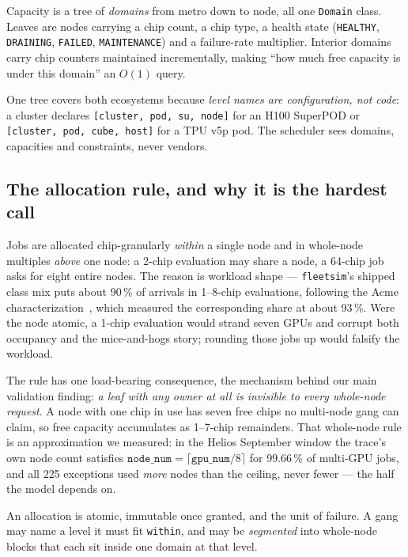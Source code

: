 Capacity is a tree of \emph{domains} from metro down to node, all one
\texttt{Domain} class. Leaves are nodes carrying a chip count, a chip type, a
health state (\texttt{HEALTHY}, \texttt{DRAINING}, \texttt{FAILED},
\texttt{MAINTENANCE}) and a failure-rate multiplier. Interior domains carry chip
counters maintained incrementally, making ``how much free capacity is under this
domain'' an $O(1)$ query.

One tree covers both ecosystems because \emph{level names are configuration, not
code}: a cluster declares \texttt{[cluster, pod, su, node]} for an H100 SuperPOD
or \texttt{[cluster, pod, cube, host]} for a TPU v5p pod. The scheduler sees
domains, capacities and constraints, never vendors.

\subsection{The allocation rule, and why it is the hardest call}

Jobs are allocated chip-granularly \emph{within} a single node and in whole-node
multiples \emph{above} one node: a 2-chip evaluation may share a node, a 64-chip
job asks for eight entire nodes. The reason is workload shape ---
\texttt{fleetsim}'s shipped class mix puts about 90\,\% of arrivals in 1--8-chip
evaluations, following the Acme characterization~\cite{acme2024}, which measured
the corresponding share at about 93\,\%. Were the node atomic,
a 1-chip evaluation would strand seven GPUs and corrupt both occupancy and the
mice-and-hogs story; rounding those jobs up would falsify the workload.

The rule has one load-bearing consequence, the mechanism behind our main
validation finding: \emph{a leaf with any owner at all is invisible to every
whole-node request}. A node with one chip in use has seven free chips no
multi-node gang can claim, so free capacity accumulates as 1--7-chip remainders.
That whole-node rule is an approximation we measured: in the Helios September
window the
trace's own node count satisfies $\texttt{node\_num} = \lceil
\texttt{gpu\_num}/8 \rceil$ for 99.66\,\% of multi-GPU jobs, and all 225
exceptions used \emph{more} nodes than the ceiling, never fewer --- the half the
model depends on.

An allocation is atomic, immutable once granted, and the unit of failure. A gang
may name a level it must fit \texttt{within}, and may be \emph{segmented} into
whole-node blocks that each sit inside one domain at that level.

